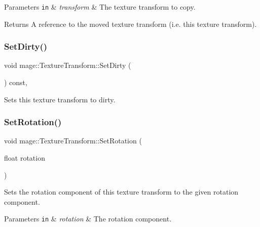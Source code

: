\begin{DoxyParams}[1]{Parameters}
\mbox{\tt in}  & {\em transform} & The texture transform to copy. \\
\hline
\end{DoxyParams}
\begin{DoxyReturn}{Returns}
A reference to the moved texture transform (i.\+e. this texture transform). 
\end{DoxyReturn}
\hypertarget{structmage_1_1_texture_transform_a471542a6be04f39307dd10ba2bb67ce1}{}\label{structmage_1_1_texture_transform_a471542a6be04f39307dd10ba2bb67ce1} 
\subsubsection{\texorpdfstring{Set\+Dirty()}{SetDirty()}}
{\footnotesize\ttfamily void mage\+::\+Texture\+Transform\+::\+Set\+Dirty (\begin{DoxyParamCaption}{ }\end{DoxyParamCaption}) const\hspace{0.3cm}{\ttfamily [private]}, {\ttfamily [noexcept]}}

Sets this texture transform to dirty. \hypertarget{structmage_1_1_texture_transform_aa185d0d366b817604dec89b9d80774e0}{}\label{structmage_1_1_texture_transform_aa185d0d366b817604dec89b9d80774e0} 
\subsubsection{\texorpdfstring{Set\+Rotation()}{SetRotation()}}
{\footnotesize\ttfamily void mage\+::\+Texture\+Transform\+::\+Set\+Rotation (\begin{DoxyParamCaption}\item[{float}]{rotation }\end{DoxyParamCaption})\hspace{0.3cm}{\ttfamily [noexcept]}}

Sets the rotation component of this texture transform to the given rotation component.


\begin{DoxyParams}[1]{Parameters}
\mbox{\tt in}  & {\em rotation} & The rotation component. \\
\hline
\end{DoxyParams}
\hypertarget{structmage_1_1_texture_transform_a3cfeae28804ccab060ccd37fcf139259}{}\label{structmage_1_1_texture_transform_a3cfeae28804ccab060ccd37fcf139259} 
